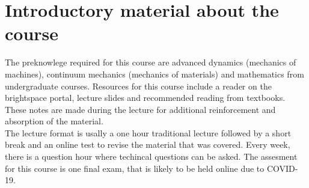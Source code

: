 \section{Introductory material about the course}
The preknowlege required for this course are advanced dynamics (mechanics of machines), continuum mechanics (mechanics of materials) and mathematics from undergraduate courses. Resources for this course include a reader on the brightspace portal, lecture slides and recommended reading from textbooks. These notes are made during the lecture for additional reinforcement and absorption of the material.\\
\newline 
The lecture format is usally a one hour traditional lecture followed by a short break and an online test to revise the material that was covered. Every week, there is a question hour where techincal questions can be asked. The assesment for this course is one final exam, that is likely to be held online due to COVID-19. 